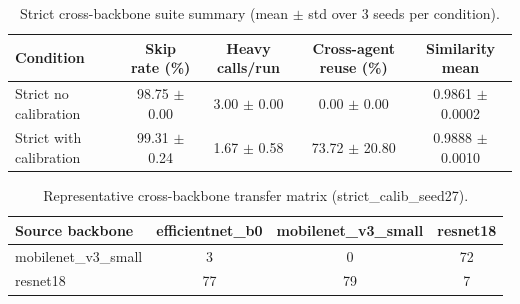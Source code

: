 \begin{table}[t]
\centering
\caption{Strict cross-backbone suite summary (mean $\pm$ std over 3 seeds per condition).}
\label{tab:strict_suite_summary}
\begin{tabular}{lcccc}
\toprule
Condition & Skip rate (\%) & Heavy calls/run & Cross-agent reuse (\%) & Similarity mean \\
\midrule
Strict no calibration & 98.75 $\pm$ 0.00 & 3.00 $\pm$ 0.00 & 0.00 $\pm$ 0.00 & 0.9861 $\pm$ 0.0002 \\
Strict with calibration & 99.31 $\pm$ 0.24 & 1.67 $\pm$ 0.58 & 73.72 $\pm$ 20.80 & 0.9888 $\pm$ 0.0010 \\
\bottomrule
\end{tabular}
\end{table}

\begin{table}[t]
\centering
\caption{Representative cross-backbone transfer matrix (strict\_calib\_seed27).}
\label{tab:strict_suite_matrix}
\begin{tabular}{lccc}
\toprule
Source backbone & efficientnet\_b0 & mobilenet\_v3\_small & resnet18 \\
\midrule
mobilenet\_v3\_small & 3 & 0 & 72 \\
resnet18 & 77 & 79 & 7 \\
\bottomrule
\end{tabular}
\end{table}
